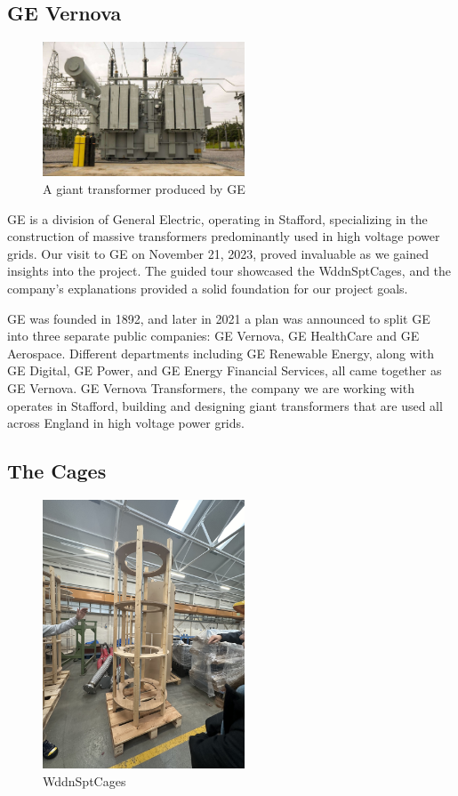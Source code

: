 \documentclass[a4paper,10pt]{article}
\begin{document}
\subsection{GE Vernova}
\begin{figure}[H]
  \centering
  \includegraphics[width=6cm]{giant-transformer}
  \caption{A giant transformer produced by \gls{GE}}
  \label{fig:giant-transformer}
\end{figure}

\gls{GE} is a division of General Electric, operating in Stafford, specializing in the construction of massive transformers predominantly used in high voltage power grids. Our visit to \gls{GE} on November 21, 2023, proved invaluable as we gained insights into the project. The guided tour showcased the \gls{WddnSptCages}, and the company's explanations provided a solid foundation for our project goals.

\gls{GE} was founded in 1892, and later in 2021 a plan was announced to split GE into three separate public companies: GE Vernova, GE HealthCare and GE Aerospace. Different departments including GE Renewable Energy, along with GE Digital, GE Power, and GE Energy Financial Services, all came together as GE Vernova. GE Vernova Transformers, the company we are working with operates in Stafford, building and designing giant transformers that are used all across England in high voltage power grids.

\subsection{The Cages}
\begin{figure}[H]
  \centering
  \includegraphics[width=6cm, angle=270]{wooden-support-cage}
  \caption{\gls{WddnSptCages}}
  \label{fig:wooden-support-cage}
\end{figure}
\end{document}

